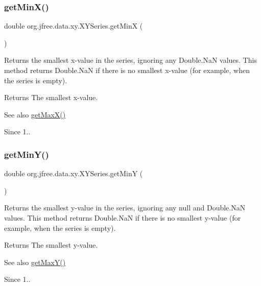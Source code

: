 \subsubsection{\texorpdfstring{get\+Min\+X()}{getMinX()}}
{\footnotesize\ttfamily double org.\+jfree.\+data.\+xy.\+X\+Y\+Series.\+get\+MinX (\begin{DoxyParamCaption}{ }\end{DoxyParamCaption})}

Returns the smallest x-\/value in the series, ignoring any Double.\+NaN values. This method returns Double.\+NaN if there is no smallest x-\/value (for example, when the series is empty).

\begin{DoxyReturn}{Returns}
The smallest x-\/value.
\end{DoxyReturn}
\begin{DoxySeeAlso}{See also}
\mbox{\hyperlink{classorg_1_1jfree_1_1data_1_1xy_1_1_x_y_series_a1fd6e9dd33f4e78955e2ead151cbf43f}{get\+Max\+X()}}
\end{DoxySeeAlso}
\begin{DoxySince}{Since}
1.. 
\end{DoxySince}
\mbox{\label{classorg_1_1jfree_1_1data_1_1xy_1_1_x_y_series_a4d5a819937e869b22195efc457ba6da7}} 
\subsubsection{\texorpdfstring{get\+Min\+Y()}{getMinY()}}
{\footnotesize\ttfamily double org.\+jfree.\+data.\+xy.\+X\+Y\+Series.\+get\+MinY (\begin{DoxyParamCaption}{ }\end{DoxyParamCaption})}

Returns the smallest y-\/value in the series, ignoring any null and Double.\+NaN values. This method returns Double.\+NaN if there is no smallest y-\/value (for example, when the series is empty).

\begin{DoxyReturn}{Returns}
The smallest y-\/value.
\end{DoxyReturn}
\begin{DoxySeeAlso}{See also}
\mbox{\hyperlink{classorg_1_1jfree_1_1data_1_1xy_1_1_x_y_series_a2e78207e795f8be478094042858c1bb0}{get\+Max\+Y()}}
\end{DoxySeeAlso}
\begin{DoxySince}{Since}
1.. 
\end{DoxySince}
\mbox{\label{classorg_1_1jfree_1_1data_1_1xy_1_1_x_y_series_a8e49ef24964fe679c9717c7524580fee}} 
